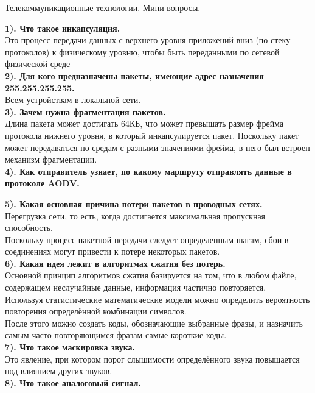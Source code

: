 \documentclass[11pt,a4paper]{article}
\author{OFFLUCK}
\begin{document}
\begin{center}
    \begin{huge}
        \textsf{Телекоммуникационные технологии. Мини-вопросы.}
    \end{huge}
\end{center}

\textbf{1). Что такое инкапсуляция.}
\\
Это процесс передачи данных с верхнего уровня приложений вниз (по стеку протоколов) к физическому уровню, чтобы быть переданными по сетевой физической среде
\\
\textbf{2). Для кого предназначены пакеты, имеющие адрес назначения 255.255.255.255.
}
\\
Всем устройствам в локальной сети.
\\
\textbf{3). Зачем нужна фрагментация пакетов.}
\\
Длина пакета может достигать 64КБ, что может превышать размер фрейма протокола нижнего уровня, в который инкапсулируется пакет. Поскольку пакет может передаваться по средам с разными значениями фрейма, в него был встроен механизм фрагментации.
\\
\textbf{4). Как отправитель узнает, по какому маршруту отправлять данные в протоколе AODV.}

\textbf{5). Какая основная причина потери пакетов в проводных сетях. 
}
\\
Перегрузка сети, то есть, когда достигается максимальная пропускная способность.
\\
Поскольку процесс пакетной передачи следует определенным шагам, сбои в соединениях могут привести к потере некоторых пакетов.
\\
\textbf{6). Какая идея лежит в алгоритмах сжатия без потерь.
}
\\
Основной принцип алгоритмов сжатия базируется на том, что в любом файле, содержащем неслучайные данные, информация частично повторяется.
\\
Используя статистические математические модели можно определить вероятность повторения определённой комбинации символов.
\\
После этого можно создать коды, обозначающие выбранные фразы, и назначить самым часто повторяющимся фразам самые короткие коды.
\\
\textbf{7). Что такое маскировка звука.
}
\\
Это явление, при котором порог слышимости определённого звука повышается под влиянием других звуков.
\\
\textbf{8). Что такое аналоговый сигнал. 
}
\end{document}
